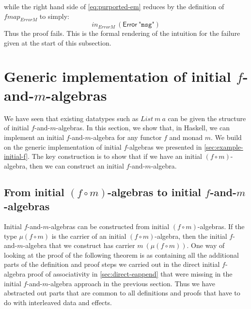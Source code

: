 \documentclass{jfp1}
\begin{document}
while the right hand side of \autoref{eq:purported-em} reduces by the
definition of $\mathit{fmap}_{\mathit{ErrorM}}$ to simply:
\begin{displaymath}
  \mathit{in}_{\mathit{ErrorM}}~(\mathsf{Error}~\texttt{"msg"})
\end{displaymath}
Thus the proof fails. This is the formal rendering of the intuition
for the failure given at the start of this subsection.


\section{Generic implementation of initial \texorpdfstring{$f$}{f}-and-\texorpdfstring{$m$}{m}-algebras}
\label{sec:impl-f-and-m}

We have seen that existing datatypes such as $\mathit{List}~m~a$ can
be given the structure of initial $f$-and-$m$-algebras. In this
section, we show that, in Haskell, we can implement an initial
$f$-and-$m$-algebra for any functor $f$ and monad $m$. We build on the
generic implementation of initial $f$-algebras we presented in
\autoref{sec:example-initial-f}. The key construction is to show that
if we have an initial $(f \circ m)$-algebra, then we can construct an
initial $f$-and-$m$-algebra.


\subsection{From initial \texorpdfstring{$(f \circ m)$}{(f . m)}-algebras to initial \texorpdfstring{$f$}{f}-and-\texorpdfstring{$m$}{m}-algebras}

Initial $f$-and-$m$-algebras can be constructed from initial $(f \circ
m)$-algebras. If the type $\mu(f \circ m)$ is the carrier of an
initial $(f \circ m)$-algebra, then the initial $f$-and-$m$-algebra
that we construct has carrier $m~(\mu (f \circ m))$. One way of
looking at the proof of the following theorem is as containing all the
additional parts of the definition and proof steps we carried out in
the direct initial $f$-algebra proof of associativity in
\autoref{sec:direct-eappend} that were missing in the initial
$f$-and-$m$-algebra approach in the previous section. Thus we have
abstracted out parts that are common to all definitions and proofs
that have to do with interleaved data and effects.
\end{document}
